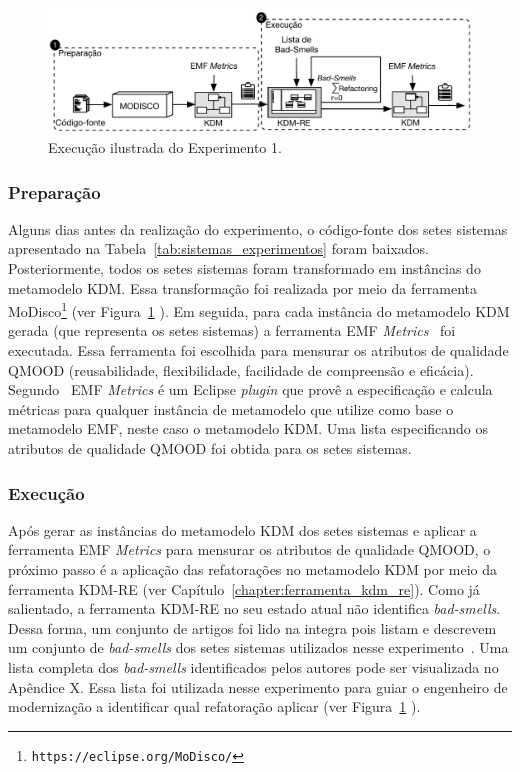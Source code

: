 \begin{figure}[h]
	\centering
	\caption{Execução ilustrada do Experimento 1.}
	\label{fig:execucao_experimento}
	\includegraphics[scale=0.9]{images/Figura_Experimento}
	\fautor
\end{figure}

\subsubsection{Preparação}

Alguns dias antes da realização do experimento, o código-fonte dos setes sistemas apresentado na Tabela~\ref{tab:sistemas_experimentos} foram baixados. Posteriormente, todos os setes sistemas foram transformado em instâncias do metamodelo KDM. Essa transformação foi realizada por meio da ferramenta MoDisco\footnote{\texttt{https://eclipse.org/MoDisco/}} (ver Figura~\ref{fig:execucao_experimento} ). Em seguida, para cada instância do metamodelo KDM gerada (que representa os setes sistemas) a ferramenta EMF \textit{Metrics}~\cite{Arendt_2012} foi executada. Essa ferramenta foi escolhida para mensurar os atributos de qualidade QMOOD (reusabilidade, flexibilidade, facilidade de compreensão e  eficácia). Segundo~ EMF \textit{Metrics} é um Eclipse \textit{plugin} que provê a especificação e calcula métricas para qualquer instância de metamodelo que utilize como base o metamodelo EMF, neste caso o metamodelo KDM. Uma lista especificando os atributos de qualidade QMOOD foi obtida para os setes sistemas.

\subsubsection{Execução}

Após gerar as instâncias do metamodelo KDM dos setes sistemas e aplicar a ferramenta EMF \textit{Metrics} para mensurar os atributos de qualidade QMOOD, o próximo passo é a aplicação das refatorações no metamodelo KDM por meio da ferramenta KDM-RE (ver Capítulo~\ref{chapter:ferramenta_kdm_re}). Como já salientado, a ferramenta KDM-RE no seu estado atual não identifica \textit{bad-smells}. Dessa forma, um conjunto de artigos foi lido na integra pois listam e descrevem um conjunto de \textit{bad-smells} dos setes sistemas utilizados nesse experimento~\cite{Kessentini_2011, Ouni_2013, Moha_2010, Kessentini_2010}. Uma lista completa dos \textit{bad-smells} identificados pelos autores pode ser visualizada no Apêndice X. Essa lista foi utilizada nesse experimento para guiar o engenheiro de modernização a identificar qual refatoração aplicar (ver Figura~\ref{fig:execucao_experimento} ).

